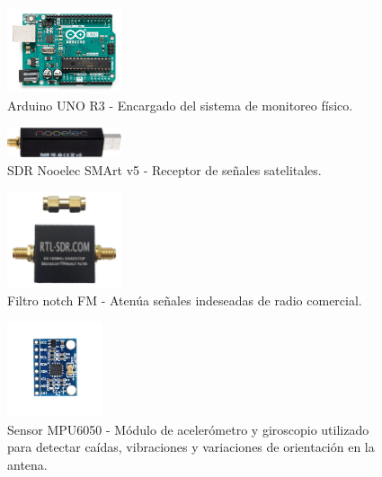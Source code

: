 \documentclass[conference]{IEEEtran}
\begin{document}
\begin{figure}[H]
    \centering
    \includegraphics[width=0.3\textwidth]{figs/arduinounor3.png}
    \caption{Arduino UNO R3 - Encargado del sistema de monitoreo físico.}
    \label{fig:arduino}
\end{figure}

\begin{figure}[H]
    \centering
    \includegraphics[width=0.3\textwidth]{figs/SDR Nooelec SMArt v5.png}
    \caption{SDR Nooelec SMArt v5 - Receptor de señales satelitales.}
    \label{fig:sdr}
\end{figure}

\begin{figure}[H]
    \centering
    \includegraphics[width=0.3\textwidth]{figs/FMFilter.png}
    \caption{Filtro notch FM - Atenúa señales indeseadas de radio comercial.}
    \label{fig:filtro}
\end{figure}

\begin{figure}[H]
    \centering
    \includegraphics[width=0.25\textwidth]{figs/MPU6050.png}
    \caption{Sensor MPU6050 - Módulo de acelerómetro y giroscopio utilizado para detectar caídas, vibraciones y variaciones de orientación en la antena.}
    \label{fig:mpu6050}
\end{figure}
\end{document}
